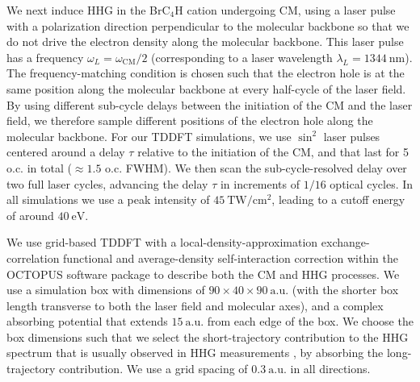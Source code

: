 \documentclass[journal=jacsat,manuscript=article]{achemso}
\begin{document}
We next induce HHG in the BrC$_{4}$H cation undergoing CM, using a laser pulse with a polarization direction perpendicular to the molecular backbone so that we do not drive the electron density along the molecular backbone. This laser pulse has a frequency $\omega_{L} = \omega_{\text{CM}}/2$ (corresponding to a laser wavelength $\lambda_{L} = 1344\ \text{nm}$). The frequency-matching condition is chosen such that the electron hole is at the same position along the molecular backbone at every half-cycle of the laser field. By using different sub-cycle delays between the initiation of the CM and the laser field, we therefore sample different positions of the electron hole along the molecular backbone. For our TDDFT simulations, we use $\sin^{2}$ laser pulses centered around a delay $\tau$ relative to the initiation of the CM, and that last for 5 o.c. in total ($\approx 1.5$ o.c. FWHM). We then scan the sub-cycle-resolved delay over two full laser cycles, advancing the delay $\tau$ in increments of $1/16$ optical cycles. In all simulations we use a peak intensity of $45\ \text{TW}/\text{cm}^{2}$, leading to a cutoff energy of around $40\ \text{eV}$.

We use grid-based TDDFT with a local-density-approximation exchange-correlation functional \cite{perdew1981, yabana1996, marques2012} and average-density self-interaction correction \cite{legrand2002, ciofini2003, tsuneda2014} within the OCTOPUS software package \cite{marques2003, castro2006, andrade2015, tancogne-dejean2020} to describe both the CM and HHG processes. We use a simulation box with dimensions of $90 \times 40 \times 90\  \text{a.u.}$ (with the shorter box length transverse to both the laser field and molecular axes), and a complex absorbing potential that extends $15\  \text{a.u.}$ from each edge of the box. We choose the box dimensions such that we select the short-trajectory contribution to the HHG spectrum that is usually observed in HHG measurements \cite{hamer2021}, by absorbing the long-trajectory contribution. We use a grid spacing of $0.3\  \text{a.u.}$ in all directions. 
\end{document}
